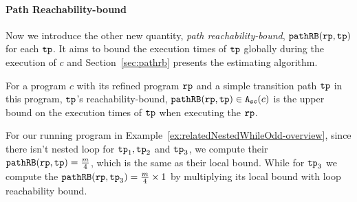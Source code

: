 \paragraph{Path Reachability-bound}
Now we introduce the other new quantity, \emph{path reachability-bound}, $\mathtt{pathRB}(\mathtt{rp}, \mathtt{tp})$ for each $\mathtt{tp}$.
It aims to bound the execution times of $\mathtt{tp}$ globally during the execution of $c$ and Section~\ref{sec:pathrb} presents the estimating algorithm.
%
\begin{defn}
For a program $c$ with its refined program $\mathtt{rp}$ and a simple transition path $\mathtt{tp}$ in this program, 
$\mathtt{tp}$'s reachability-bound, $\mathtt{pathRB}(\mathtt{rp}, \mathtt{tp}) \in {\ensuremath{\mathtt{A_{sc}}}}(c)$ is the upper bound on the
execution times of $\mathtt{tp}$ when executing the $\mathtt{rp}$.
\end{defn}

For our running program in Example~\ref{ex:relatedNestedWhileOdd-overview}, since there isn't nested loop for $\mathtt{tp}_1, \mathtt{tp}_2$ and $\mathtt{tp}_3$, we compute their $\mathtt{pathRB}(\mathtt{rp}, \mathtt{tp}) = \frac{m}{4} $, which is the same as their local bound.
While for $\mathtt{tp}_3$ we compute  the $\mathtt{pathRB}(\mathtt{rp}, \mathtt{tp}_3) = \frac{m}{4} \times 1$ by multiplying its local bound with loop reachability bound.


